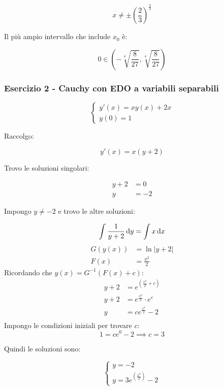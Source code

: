 \[
    x \neq \pm {\left(\frac{2}{3}\right)}^{\frac{3}{4}}
\]

Il più ampio intervallo che include \(x_0\) è:

\[
    0 \in \left(-\sqrt[4]{\frac{8}{27}}, \sqrt[4]{\frac{8}{27}}\right)
\]

\pagebreak
\subsubsection*{Esercizio 2 {-} Cauchy con EDO a variabili separabili}

\begin{equation*}
    \begin{cases}
        y'(x) = xy(x)+2x \\
        y(0) = 1
    \end{cases}
\end{equation*}

Raccolgo:

\[
    y'(x)=x(y+2)
\]

Trovo le soluzioni singolari:

\begin{align*}
    y+2 & =0  \\
    y   & =-2
\end{align*}

Impongo \(y \ne -2\) e trovo le altre soluzioni:

\[
    \int \frac{1}{y+2} \mathop{}\!\mathrm{d} y = \int x \mathop{}\!\mathrm{d} x
\]
\begin{align*}
    G(y(x)) & = \ln |y+2|     \\
    F(x)    & = \frac{x^2}{2}
\end{align*}
Ricordando che \(y(x) = G^{-1}(F(x) + c)\):
\begin{align*}
    y + 2 & = e^{\left( \frac{x^2}{2} + c \right)} \\
    y + 2 & = e^{\frac{x^{2}}{2}} \cdot e^c        \\
    y     & = ce^{\frac{x^{2}}{2}} - 2             \\
\end{align*}
Impongo le condizioni iniziali per trovare \(c\):
\[
    1 = c e^0 - 2 \implies c = 3
\]

Quindi le soluzioni sono:

\begin{equation*}
    \begin{cases}
        y = -2 \\
        y = 3e^{\left( \frac{x^{2}}{2} \right)} - 2
    \end{cases}
\end{equation*}
